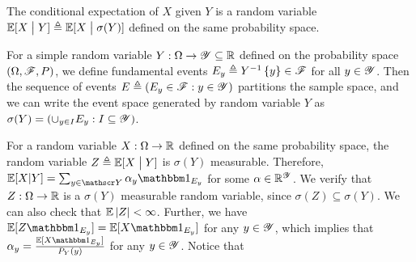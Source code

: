 \documentclass[letterpaper,10pt,english]{article}
\begin{document}
\begin{defn}%
The conditional expectation of $X$ given $Y$ is a random variable $\mathbb{E}[X\; \big\vert \; Y] \triangleq \mathbb{E}[X\; \big\vert \;\sigma(Y)]$ defined on the same probability space. 
\end{defn}
\begin{shaded}
\begin{exmp} 
For a simple random variable $Y: \Omega \to \mathscr{Y} \subseteq \mathbb{R}$ defined on the probability space $(\Omega, \mathscr{F}, P)$, 
we define fundamental events $E_y \triangleq Y^{-1}\left\{y\right\} \in \mathscr{F}$ for all $y \in \mathscr{Y}$. 
Then the sequence of events $E \triangleq (E_y \in \mathscr{F}: y \in \mathscr{Y})$ partitions the sample space, 
and we can write the event space generated by random variable $Y$ as $\sigma(Y) = (\cup_{y\in I}E_y: I \subseteq \mathscr{Y})$. 

For a random variable $X: \Omega \to \mathbb{R}$ defined on the same probability space, 
the random variable $Z \triangleq \mathbb{E}[X\; \big\vert \; Y]$ is $\sigma(Y)$ measurable. 
Therefore, $\E[X| Y] = \sum_{y\in\sY}\alpha_y\Ind{E_y}$ for some $\alpha\in\mathbb{R}^{\mathscr{Y}}$. 
We verify that $Z:\Omega\to\mathbb{R}$ is a $\sigma(Y)$ measurable random variable, 
since $\sigma(Z) \subseteq \sigma(Y)$. 
We can also check that $\mathbb{E}\left\lvert Z\right\rvert < \infty$. 
Further, we have $\E[Z\Ind{E_y}] = \E[X\Ind{E_y}]$ for any $y \in \mathscr{Y}$, 
which implies that $\alpha_y = \frac{\E[X\Ind{E_y}]}{P_Y(y)}$ for any $y \in \mathscr{Y}$.
Notice that 
\end{exmp}
\end{shaded}
\end{document}

